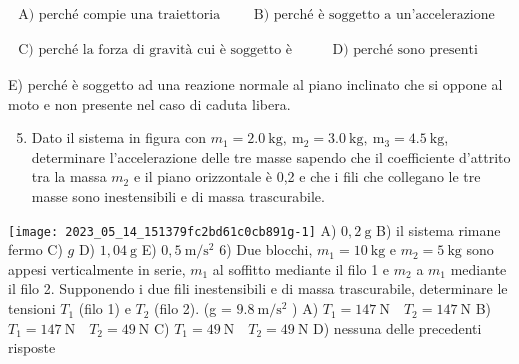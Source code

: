 \documentclass[10pt]{article}
\begin{document}
\(\begin{array}{ll}\text { A) perché compie una traiettoria più lunga } & \text { B) perché è soggetto a un'accelerazione inferiore }\end{array}\)

\(\begin{array}{ll}\text { C) perché la forza di gravità cui è soggetto è inferiore } & \text { D) perché sono presenti attriti }\end{array}\)

E) perché è soggetto ad una reazione normale al piano inclinato che si oppone al moto e non presente nel caso di caduta libera.

\begin{enumerate}
  \setcounter{enumi}{4}
  \item Dato il sistema in figura con \(m_{1}=2.0 \mathrm{~kg}, \mathrm{~m}_{2}=3.0 \mathrm{~kg}, \mathrm{~m}_{3}=4.5 \mathrm{~kg}\), determinare l'accelerazione delle tre masse sapendo che il coefficiente d'attrito tra la massa \(m_{2}\) e il piano orizzontale è 0,2 e che i fili che collegano le tre masse sono inestensibili e di massa trascurabile.
\end{enumerate}

\texttt{[image: 2023\_05\_14\_151379fc2bd61c0cb891g-1]}
A) \(0,2 \mathrm{~g}\)
B) il sistema rimane fermo
C) \(g\)
D) \(1,04 \mathrm{~g}\)
E) \(0,5 \mathrm{~m} / \mathrm{s}^{2}\) 6) Due blocchi, \(m_{1}=10 \mathrm{~kg}\) e \(m_{2}=5 \mathrm{~kg}\) sono appesi verticalmente in serie, \(m_{1}\) al soffitto mediante il filo 1 e \(m_{2}\) a \(m_{1}\) mediante il filo 2. Supponendo i due fili inestensibili e di massa trascurabile, determinare le tensioni \(T_{1}\) (filo 1) e \(T_{2}\) (filo 2). (g = \(9.8 \mathrm{~m} / \mathrm{s}^{2}\) )
A) \(T_{1}=147 \mathrm{~N} \quad T_{2}=147 \mathrm{~N}\)
B) \(T_{1}=147 \mathrm{~N} \quad T_{2}=49 \mathrm{~N}\)
C) \(T_{1}=49 \mathrm{~N} \quad T_{2}=49 \mathrm{~N}\)
D) nessuna delle precedenti risposte
\end{document}
